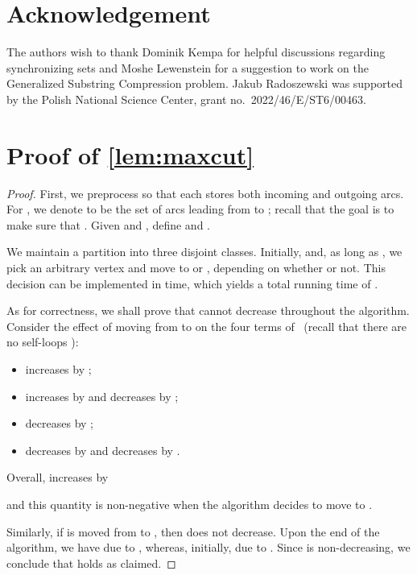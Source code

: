 \documentclass[a4paper]{article}
\theoremstyle{definition}
\theoremstyle{remark}
\begin{document}
\section*{Acknowledgement}
The authors wish to thank Dominik Kempa for helpful discussions regarding synchronizing sets
and Moshe Lewenstein for a suggestion to work on the Generalized Substring Compression problem.
Jakub Radoszewski was supported by the Polish National Science Center, grant no.\ 2022/46/E/ST6/00463.




\appendix

\section{Proof of \cref{lem:maxcut}}\label{app:AMDC}

\AMDC*
\begin{proof}
First, we preprocess  so that each  stores both incoming and outgoing arcs.
For , we denote  to be the set of arcs leading from  to ;
recall that the goal is to make sure that .
Given  and , define 
and .

We maintain a partition  into three disjoint classes.
Initially,  and, as long as , we pick an arbitrary vertex 
and move  to  or , depending on whether 
or not.
This decision can be implemented in  time, which yields a total running time of .

As for correctness, we shall prove that 
cannot decrease throughout the algorithm.
Consider the effect of moving  from  to  on the four terms of~ (recall that there are no self-loops ):
\begin{itemize}
  \item  increases by ;
  \item  increases by  and decreases by ;
  \item  decreases by ;
  \item  decreases by  and decreases by .
\end{itemize}
Overall,  increases by 
  
and this quantity is non-negative when the algorithm decides to move  to . 

Similarly, if  is moved from  to , then  does not decrease.
Upon the end of the algorithm, we have  due to ,
whereas, initially,  due to . 
Since  is non-decreasing, we conclude that  holds as claimed. 
\end{proof}
\end{document}
